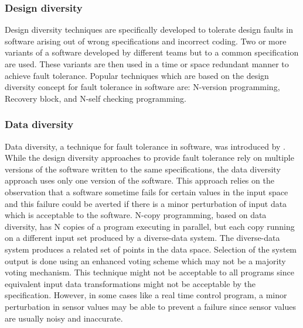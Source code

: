 \documentclass[a4paper, 11pt]{article}
\begin{document}

\subsubsection{Design diversity}
Design diversity techniques are specifically developed to tolerate design faults in software arising out of wrong specifications and incorrect coding. Two or more variants of a software developed by different teams but to a common specification are used. These variants are then used in a time or space redundant manner to achieve fault tolerance. Popular techniques which are based on the design diversity concept for fault tolerance in software are: N-version programming, Recovery block, and N-self checking programming.

\subsubsection{Data diversity}
Data diversity, a technique for fault tolerance in software, was introduced by \citet{ammann1988data}. While the design diversity approaches to provide fault tolerance rely on multiple versions of the software written to the same specifications, the data diversity approach uses only one version of the software. This approach relies on the observation that a software sometime fails for certain values in the input space and this failure could be averted if there is a minor perturbation of input data which is acceptable to the software. N-copy programming, based on data diversity, has N copies of a program executing in parallel, but each copy running on a different input set produced by a diverse-data system. The diverse-data system produces a related set of points in the data space. Selection of the system output is done using an enhanced voting scheme which may not be a majority voting mechanism. This technique might not be acceptable to all programs since equivalent input data transformations might not be acceptable by the specification. However, in some cases like a real time control program, a minor perturbation in sensor values may be able to prevent a failure since sensor values are usually noisy and inaccurate.
\end{document}
